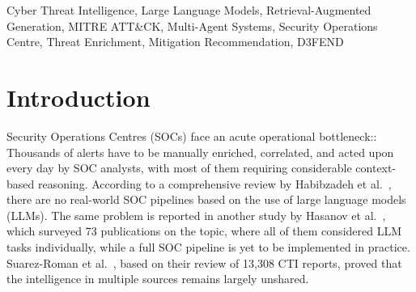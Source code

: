 \documentclass[conference]{IEEEtran}
\begin{document}
\begin{IEEEkeywords}
Cyber Threat Intelligence, Large Language Models, Retrieval-Augmented
Generation, MITRE ATT\&CK, Multi-Agent Systems, Security Operations Centre,
Threat Enrichment, Mitigation Recommendation, D3FEND
\end{IEEEkeywords}

\section{Introduction}
\label{sec:intro}

Security Operations Centres (SOCs) face an acute operational bottleneck::
Thousands of alerts have to be manually enriched, correlated, and acted upon every day by SOC analysts, with most of them requiring considerable context-based reasoning. According to a comprehensive review by Habibzadeh et al.~\cite{habibzadeh2025soc}, there are no real-world SOC pipelines based on the use of large language models (LLMs). The same problem is reported in another study by Hasanov et al.~\cite{hasanov2024llm}, which surveyed 73 publications on the topic, where all of them considered LLM tasks individually, while a full SOC pipeline is yet to be implemented in practice. Suarez-Roman et al.~\cite{suarez2026echo}, based on their review of 13,308 CTI reports, proved that the intelligence in multiple sources remains largely unshared.
\end{document}
